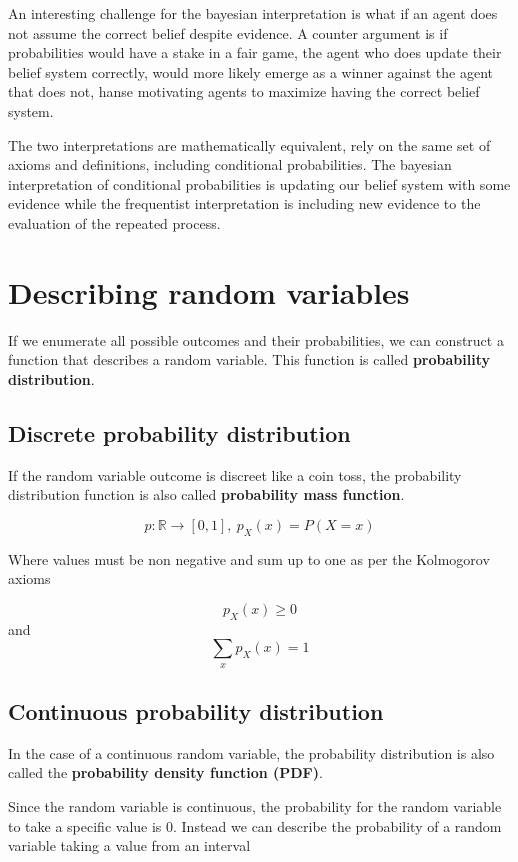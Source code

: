 An interesting challenge for the bayesian interpretation is what if an agent does not assume the correct belief despite evidence. A counter argument is if probabilities would have a stake in a fair game, the agent who does update their belief system correctly, would more likely emerge as a winner against the agent that does not, hanse motivating agents to maximize having the correct belief system.

The two interpretations are mathematically equivalent, rely on the same set of axioms and definitions, including conditional probabilities. The bayesian interpretation of conditional probabilities is updating our belief system with some evidence while the frequentist interpretation is including new evidence to the evaluation of the repeated process.

\section{Describing random variables}
If we enumerate all possible outcomes and their probabilities, we can construct a function that describes a random variable. This function is called \textbf{probability distribution}.

\subsection{Discrete probability distribution}

If the random variable outcome is discreet like a coin toss, the probability distribution function is also called \textbf{probability mass function}.

\[p: \mathbb{R} \to [0, 1], \  p_X(x) = P(X = x)\]

Where values must be non negative and sum up to one as per the Kolmogorov axioms

\[p_X(x) \ge 0\]
and
\[\sum_x p_X(x) = 1\]

\subsection{Continuous probability distribution}

In the case of a continuous random variable, the probability distribution is also called the \textbf{probability density function (PDF)}.

Since the random variable is continuous, the probability for the random variable to take a specific value is \(0\). Instead we can describe the probability of a random variable taking a value from an interval

